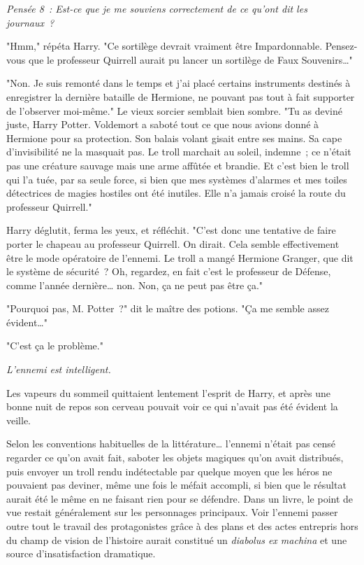\emph{Pensée 8~: Est-ce que je me souviens correctement de ce qu'ont dit les journaux~?}

"Hmm," répéta Harry. "Ce sortilège devrait vraiment être Impardonnable. Pensez-vous que le professeur Quirrell aurait pu lancer un sortilège de Faux Souvenirs…"

"Non. Je suis remonté dans le temps et j'ai placé certains instruments destinés à enregistrer la dernière bataille de Hermione, ne pouvant pas tout à fait supporter de l'observer moi-même." Le vieux sorcier semblait bien sombre. "Tu as deviné juste, Harry Potter. Voldemort a saboté tout ce que nous avions donné à Hermione pour sa protection. Son balais volant gisait entre ses mains. Sa cape d'invisibilité ne la masquait pas. Le troll marchait au soleil, indemne~; ce n'était pas une créature sauvage mais une arme affûtée et brandie. Et c'est bien le troll qui l'a tuée, par sa seule force, si bien que mes systèmes d'alarmes et mes toiles détectrices de magies hostiles ont été inutiles. Elle n'a jamais croisé la route du professeur Quirrell."

Harry déglutit, ferma les yeux, et réfléchit. "C'est donc une tentative de faire porter le chapeau au professeur Quirrell. On dirait. Cela semble effectivement être le mode opératoire de l'ennemi. Le troll a mangé Hermione Granger, que dit le système de sécurité~? Oh, regardez, en fait c'est le professeur de Défense, comme l'année dernière… non. Non, ça ne peut pas être ça."

"Pourquoi pas, M. Potter~?" dit le maître des potions. "Ça me semble assez évident…"

"C'est ça le problème."

\emph{L'ennemi est intelligent.}

Les vapeurs du sommeil quittaient lentement l'esprit de Harry, et après une bonne nuit de repos son cerveau pouvait voir ce qui n'avait pas été évident la veille.

Selon les conventions habituelles de la littérature… l'ennemi n'était pas censé regarder ce qu'on avait fait, saboter les objets magiques qu'on avait distribués, puis envoyer un troll rendu indétectable par quelque moyen que les héros ne pouvaient pas deviner, même une fois le méfait accompli, si bien que le résultat aurait été le même en ne faisant rien pour se défendre. Dans un livre, le point de vue restait généralement sur les personnages principaux. Voir l'ennemi passer outre tout le travail des protagonistes grâce à des plans et des actes entrepris hors du champ de vision de l'histoire aurait constitué un \emph{diabolus ex machina} et une source d'insatisfaction dramatique.

